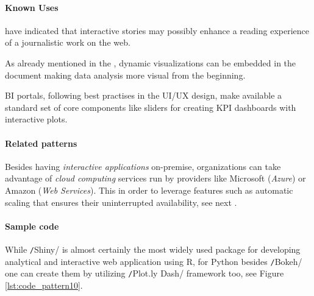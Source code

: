 \paragraph*{Known Uses}
\begin{compactitem}
  \item \textcites{DickInteractive2014}{SegelHeer2010} have indicated that interactive stories may possibly enhance a reading experience of a journalistic work on the web.
  \item As already mentioned in the , dynamic visualizations can be embedded in the document making data analysis more visual from the beginning.
  \item \ac{BI} portals, following best practises in the \ac{UI/UX} design, make available a standard set of core components like sliders for creating \ac{KPI} dashboards with interactive plots.
\end{compactitem}

\paragraph*{Related patterns}
Besides having \emph{interactive applications} on-premise, organizations can take advantage of \emph{cloud computing} services run by providers like Microsoft (\emph{Azure}) or Amazon (\emph{Web Services}). 
This in order to leverage features such as automatic scaling that ensures their uninterrupted availability, see next . 

\paragraph*{Sample code}
While \texttt/Shiny/ is almost certainly the most widely used package for developing analytical and interactive web application using R, for Python besides \texttt/Bokeh/ one can create them by utilizing \texttt/Plot.ly Dash/ framework too, see Figure \ref{lst:code_pattern10}.

